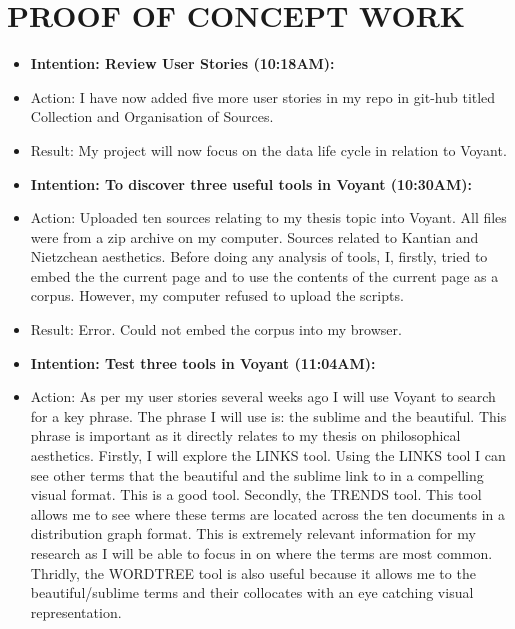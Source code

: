 \documentclass[a4paper,12pt]{article}
\begin{document}
\section{PROOF OF CONCEPT WORK}


\begin{itemize} 

\item \textbf{Intention: Review User Stories (10:18AM):}

\item Action: I have now added five more user stories in my repo in git-hub titled Collection and Organisation of Sources.

\item Result: My project will now focus on the data life cycle in relation to Voyant. 


\item \textbf{Intention: To discover three useful tools in Voyant (10:30AM):}


\item Action: Uploaded ten sources relating to my thesis topic into Voyant. All files were from a zip archive on my computer. Sources related to Kantian and Nietzchean aesthetics. Before doing any analysis of tools, I, firstly, tried to embed the the current page and to use the contents of the current page as a corpus. However, my computer refused to upload the scripts. 


\item Result: Error. Could not embed the corpus into my browser. 


\item \textbf{Intention: Test three tools in Voyant (11:04AM):}


\item Action: As per my user stories several weeks ago I will use Voyant to search for a key phrase. The phrase I will use is: the sublime and the beautiful. This phrase is important as it directly relates to my thesis on philosophical aesthetics. Firstly, I will explore the LINKS tool. Using the LINKS tool I can see other terms that the beautiful and the sublime link to in a compelling visual format. This is a good tool. Secondly, the TRENDS tool. This tool allows me to see where these terms are located across the ten documents in a distribution graph format. This is extremely relevant information for my research as I will be able to focus in on where the terms are most common. Thridly, the WORDTREE tool is also useful because it allows me to the beautiful/sublime terms and their collocates with an eye catching visual representation. 



\end{itemize}
\end{document}
